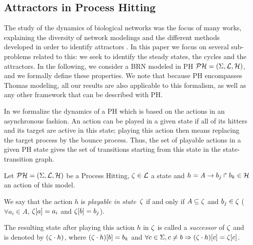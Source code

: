 \subsection{Attractors in Process Hitting}

The study of the dynamics of biological networks was the focus of many works, explaining the diversity of network modelings and the different methods developed in order to identify attractors \cite{skodawessely2011finding, zhang2007algorithms, mushthofa2014asp, akutsu2012finding, berntenis2013detection}.
In this paper we focus on several sub-problems related to this: we seek to identify the steady states, the cycles and the attractors. %
In the following, we consider a BRN modeled in PH $\mathcal{PH}=(\Sigma,\mathcal{L},\mathcal{H})$,
and we formally define these properties.
We note that because PH encompasses Thomas modeling, all our results are also applicable to this formalism, as well as any other framework that can be described with PH.

In  we formalize the dynamics of a PH which is based on the actions in an asynchronous fashion.
An action can be played in a given state if all of its hitters and its target are active in this state; playing this action then means replacing the target process by the bounce process.
Thus, the set of playable actions in a given PH state gives the set of transitions starting from this state in the state-transition graph.

\begin{definition}
\label{def:playableAction}
Let $\mathcal{PH} = (\Sigma,\mathcal{L},\mathcal{H})$ be a Process Hitting, $\zeta \in \mathcal{L}$ a state and $h = A\rightarrow b_j\Rsh b_k \in \mathcal{H}$ an action of this model.

We say that the action $h$
is \emph{playable in state~$\zeta$} if and only if
$A \subseteq \zeta$ and $b_j \in \zeta$ (\ie $\forall a_i \in A$, ${\zeta[a]} = a_i$ and ${\zeta[b]}=b_j$).

The resulting state after playing this action $h$ in $\zeta$
is called a \emph{successor} of $\zeta$ and
is denoted by $(\zeta \cdot h)$,
where ${(\zeta \cdot h)[b]} = b_k$ and
$\forall c \in \Sigma, c \neq b \Rightarrow {(\zeta\cdot h)[c]}={\zeta[c]}$.
\end{definition}

